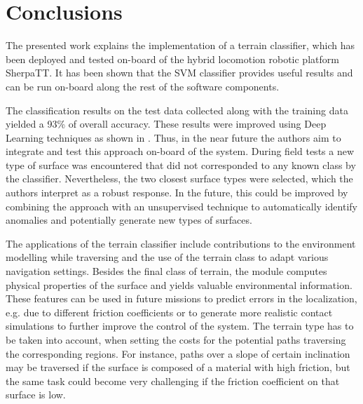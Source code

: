 
\section{Conclusions}

The presented work explains the implementation of a terrain classifier, which has been deployed and tested on-board of the hybrid locomotion robotic platform SherpaTT.
It has been shown that the SVM classifier provides useful results and can be run on-board along the rest of the software components.

The classification results on the test data collected along with the training data yielded a 93\% of overall accuracy. 
These results were improved using Deep Learning techniques as shown in \cite{ugenti2021}. 
Thus, in the near future the authors aim to integrate and test this approach on-board of the system.
During field tests a new type of surface was encountered that did not corresponded to any known class by the classifier. 
Nevertheless, the two closest surface types were selected, which the authors interpret as a robust response.
In the future, this could be improved by combining the approach with an unsupervised technique to automatically identify anomalies and potentially generate new types of surfaces.

The applications of the terrain classifier include contributions to the environment modelling while traversing and the use of the terrain class to adapt various navigation settings.
Besides the final class of terrain, the module computes physical properties of the surface and yields valuable environmental information. 
These features can be used in future missions to predict errors in the localization, e.g. due to different friction coefficients or to generate more realistic contact simulations to further improve the control of the system.
The terrain type has to be taken into account, when setting the costs for the potential paths traversing the corresponding regions. 
For instance, paths over a slope of certain inclination may be traversed if the surface is composed of a material with high friction, but the same task could become very challenging if the friction coefficient on that surface is low. 

